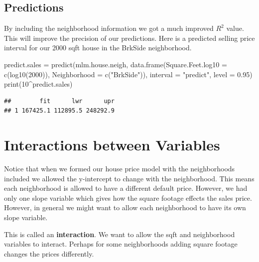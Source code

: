 \documentclass[
]{book}
\newenvironment{Shaded}{\begin{snugshade}}{\end{snugshade}}
\newcommand{\AttributeTok}[1]{\textcolor[rgb]{0.77,0.63,0.00}{#1}}
\newcommand{\DecValTok}[1]{\textcolor[rgb]{0.00,0.00,0.81}{#1}}
\newcommand{\FloatTok}[1]{\textcolor[rgb]{0.00,0.00,0.81}{#1}}
\newcommand{\FunctionTok}[1]{\textcolor[rgb]{0.00,0.00,0.00}{#1}}
\newcommand{\NormalTok}[1]{#1}
\newcommand{\OtherTok}[1]{\textcolor[rgb]{0.56,0.35,0.01}{#1}}
\newcommand{\SpecialCharTok}[1]{\textcolor[rgb]{0.00,0.00,0.00}{#1}}
\newcommand{\StringTok}[1]{\textcolor[rgb]{0.31,0.60,0.02}{#1}}
\theoremstyle{definition}
\theoremstyle{definition}
\theoremstyle{definition}
\theoremstyle{definition}
\theoremstyle{remark}
\begin{document}
\hypertarget{predictions}{%
\subsection{Predictions}\label{predictions}}

By including the neighborhood information we got a much improved \(R^2\) value. This will improve the precision of our predictions. Here is a predicted selling price interval for our 2000 sqft house in the BrkSide neighborhood.

\begin{Shaded}
\begin{Highlighting}[]
\NormalTok{predict.sales }\OtherTok{=} \FunctionTok{predict}\NormalTok{(mlm.house.neigh, }\FunctionTok{data.frame}\NormalTok{(}\AttributeTok{Square.Feet.log10 =} \FunctionTok{c}\NormalTok{(}\FunctionTok{log10}\NormalTok{(}\DecValTok{2000}\NormalTok{)),}
    \AttributeTok{Neighborhood =} \FunctionTok{c}\NormalTok{(}\StringTok{"BrkSide"}\NormalTok{)), }\AttributeTok{interval =} \StringTok{"predict"}\NormalTok{, }\AttributeTok{level =} \FloatTok{0.95}\NormalTok{)}
\FunctionTok{print}\NormalTok{(}\DecValTok{10}\SpecialCharTok{\^{}}\NormalTok{predict.sales)}
\end{Highlighting}
\end{Shaded}

\begin{verbatim}
##        fit      lwr      upr
## 1 167425.1 112895.5 248292.9
\end{verbatim}

\hypertarget{interactions-between-variables}{%
\section{Interactions between Variables}\label{interactions-between-variables}}

Notice that when we formed our house price model with the neighborhoods included we allowed the y-intercept to change with the neighborhood. This means each neighborhood is allowed to have a different default price. However, we had only one slope variable which gives how the square footage effects the sales price. However, in general we might want to allow each neighborhood to have its own slope variable.

This is called an \textbf{interaction}. We want to allow the sqft and neighborhood variables to interact. Perhaps for some neighborhoods adding square footage changes the prices differently.
\end{document}
